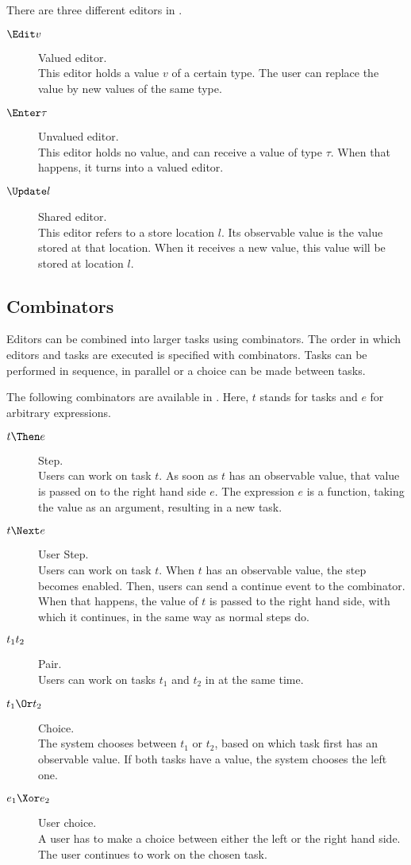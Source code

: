 There are three different editors in \TOPHAT.
\begin{description}
  \item[$\Edit v$] Valued editor.\\
    This editor holds a value $v$ of a certain type.
    The user can replace the value by new values of the same type.
  \item[$\Enter \tau$] Unvalued editor.\\
    This editor holds no value, and can receive a value of type $\tau$.
    When that happens, it turns into a valued editor.
  \item[$\Update l$] Shared editor.\\
    This editor refers to a store location $l$.
    Its observable value is the value stored at that location.
    When it receives a new value, this value will be stored at location $l$.
\end{description}


\subsection{Combinators}

Editors can be combined into larger tasks using combinators.
The order in which editors and tasks are executed is specified with combinators. Tasks can be performed in sequence, in parallel or a choice can be made between tasks.


The following combinators are available in \TOPHAT.
Here, $t$ stands for tasks and $e$ for arbitrary expressions.
\begin{description}
  \item[$t \Then e$] Step.\\
    Users can work on task $t$.
    As soon as $t$ has an observable value, that value is passed on to the right hand side $e$.
    The expression $e$ is a function, taking the value as an argument, resulting in a new task.
  \item[$t \Next e$] User Step.\\
    Users can work on task $t$.
    When $t$ has an observable value, the step becomes enabled.
    Then, users can send a continue event to the combinator.
    When that happens, the value of $t$ is passed to the right hand side, with which it continues,
    in the same way as normal steps do.
  \item[$t_1 \relax t_2$] Pair.\\
    Users can work on tasks $t_1$ and $t_2$ in at the same time.
  \item[$t_1 \Or t_2$] Choice.\\
    The system chooses between $t_1$ or $t_2$,
    based on which task first has an observable value.
    If both tasks have a value, the system chooses the left one.
  \item[$e_1 \Xor e_2$] User choice.\\
    A user has to make a choice between either the left or the right hand side.
    The user continues to work on the chosen task.
\end{description}

